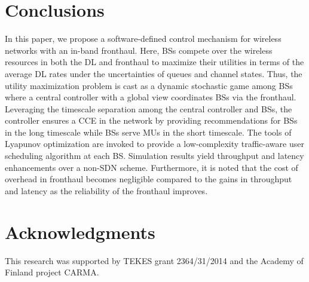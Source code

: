 \documentclass[conference]{IEEEtran}
\begin{document}
\section{Conclusions}\label{Sec: Conclusions}
%


In this paper, we propose a software-defined control mechanism for wireless networks with an in-band fronthaul. Here, BSs compete over the wireless resources in both the DL and fronthaul to maximize their utilities in terms of the average DL rates under the uncertainties of queues and channel states. Thus, the utility maximization problem is cast as a dynamic stochastic game among BSs where a central controller with a global view coordinates BSs via the fronthaul. Leveraging the timescale separation among the central controller and BSs, the controller ensures a CCE in the network by providing recommendations for BSs in the long timescale while BSs serve MUs in the short timescale. The tools of  Lyapunov optimization are invoked to provide a low-complexity traffic-aware user scheduling algorithm at each BS. Simulation results yield  throughput and latency enhancements over a non-SDN scheme. Furthermore, it is noted that the cost of overhead in fronthaul becomes negligible compared to the gains in throughput and  latency as the reliability of the fronthaul improves.



\section*{Acknowledgments}
This research was supported by TEKES grant 2364/31/2014 and the Academy of Finland  project CARMA.

\appendices
\end{document}
